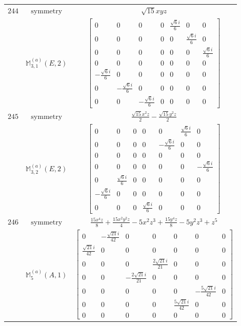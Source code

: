 \documentclass[fleqn,8pt,landscape]{jsarticle}
\begin{document}
\begin{longtable}{ccc}
$ 244 $ & $ \text{symmetry} $ & $ \sqrt{15} x y z $ \\
$  $ & $ \mathbb{M}_{3,1}^{(a)}(E,2) $ & $ \begin{bmatrix} 0 & 0 & 0 & 0 & \frac{\sqrt{6} i}{6} & 0 & 0 \\ 0 & 0 & 0 & 0 & 0 & \frac{\sqrt{6} i}{6} & 0 \\ 0 & 0 & 0 & 0 & 0 & 0 & \frac{\sqrt{6} i}{6} \\ 0 & 0 & 0 & 0 & 0 & 0 & 0 \\ - \frac{\sqrt{6} i}{6} & 0 & 0 & 0 & 0 & 0 & 0 \\ 0 & - \frac{\sqrt{6} i}{6} & 0 & 0 & 0 & 0 & 0 \\ 0 & 0 & - \frac{\sqrt{6} i}{6} & 0 & 0 & 0 & 0 \end{bmatrix} $ \\ \hline
$ 245 $ & $ \text{symmetry} $ & $ \frac{\sqrt{15} x^{2} z}{2} - \frac{\sqrt{15} y^{2} z}{2} $ \\
$  $ & $ \mathbb{M}_{3,2}^{(a)}(E,2) $ & $ \begin{bmatrix} 0 & 0 & 0 & 0 & 0 & \frac{\sqrt{6} i}{6} & 0 \\ 0 & 0 & 0 & 0 & - \frac{\sqrt{6} i}{6} & 0 & 0 \\ 0 & 0 & 0 & 0 & 0 & 0 & 0 \\ 0 & 0 & 0 & 0 & 0 & 0 & - \frac{\sqrt{6} i}{6} \\ 0 & \frac{\sqrt{6} i}{6} & 0 & 0 & 0 & 0 & 0 \\ - \frac{\sqrt{6} i}{6} & 0 & 0 & 0 & 0 & 0 & 0 \\ 0 & 0 & 0 & \frac{\sqrt{6} i}{6} & 0 & 0 & 0 \end{bmatrix} $ \\ \hline
$ 246 $ & $ \text{symmetry} $ & $ \frac{15 x^{4} z}{8} + \frac{15 x^{2} y^{2} z}{4} - 5 x^{2} z^{3} + \frac{15 y^{4} z}{8} - 5 y^{2} z^{3} + z^{5} $ \\
$  $ & $ \mathbb{M}_{5}^{(a)}(A,1) $ & $ \begin{bmatrix} 0 & - \frac{\sqrt{21} i}{42} & 0 & 0 & 0 & 0 & 0 \\ \frac{\sqrt{21} i}{42} & 0 & 0 & 0 & 0 & 0 & 0 \\ 0 & 0 & 0 & \frac{2 \sqrt{21} i}{21} & 0 & 0 & 0 \\ 0 & 0 & - \frac{2 \sqrt{21} i}{21} & 0 & 0 & 0 & 0 \\ 0 & 0 & 0 & 0 & 0 & - \frac{5 \sqrt{21} i}{42} & 0 \\ 0 & 0 & 0 & 0 & \frac{5 \sqrt{21} i}{42} & 0 & 0 \\ 0 & 0 & 0 & 0 & 0 & 0 & 0 \end{bmatrix} $ \\ \hline

\end{longtable}
\end{document}
